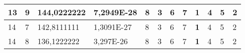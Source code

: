 \documentclass[conference]{IEEEtran}
\begin{document}
\begin{table*}[]
\begin{tabular}{|llll|llllllll|}
\multicolumn{1}{|l|}{13}                                                             & \multicolumn{1}{l|}{9}                                                                 & \multicolumn{1}{l|}{144,0222222}                                                           & 7,2949E-28                              & \multicolumn{1}{l|}{8}                                                           & \multicolumn{1}{l|}{3}                                                           & \multicolumn{1}{l|}{6}                                                           & \multicolumn{1}{l|}{7}                                                           & \multicolumn{1}{l|}{\textbf{1}}                                                  & \multicolumn{1}{l|}{4}                                                           & \multicolumn{1}{l|}{5}                                                           & 2                                   \\ \hline
\multicolumn{1}{|l|}{14}                                                             & \multicolumn{1}{l|}{7}                                                                 & \multicolumn{1}{l|}{142,8111111}                                                           & 1,3091E-27                              & \multicolumn{1}{l|}{8}                                                           & \multicolumn{1}{l|}{3}                                                           & \multicolumn{1}{l|}{6}                                                           & \multicolumn{1}{l|}{7}                                                           & \multicolumn{1}{l|}{\textbf{1}}                                                  & \multicolumn{1}{l|}{4}                                                           & \multicolumn{1}{l|}{5}                                                           & 2                                   \\ \hline
\multicolumn{1}{|l|}{14}                                                             & \multicolumn{1}{l|}{8}                                                                 & \multicolumn{1}{l|}{136,1222222}                                                           & 3,297E-26                               & \multicolumn{1}{l|}{8}                                                           & \multicolumn{1}{l|}{3}                                                           & \multicolumn{1}{l|}{6}                                                           & \multicolumn{1}{l|}{7}                                                           & \multicolumn{1}{l|}{\textbf{1}}                                                  & \multicolumn{1}{l|}{4}                                                           & \multicolumn{1}{l|}{5}                                                           & 2                                   \\ \hline

\end{tabular}
\end{table*}
\end{document}
